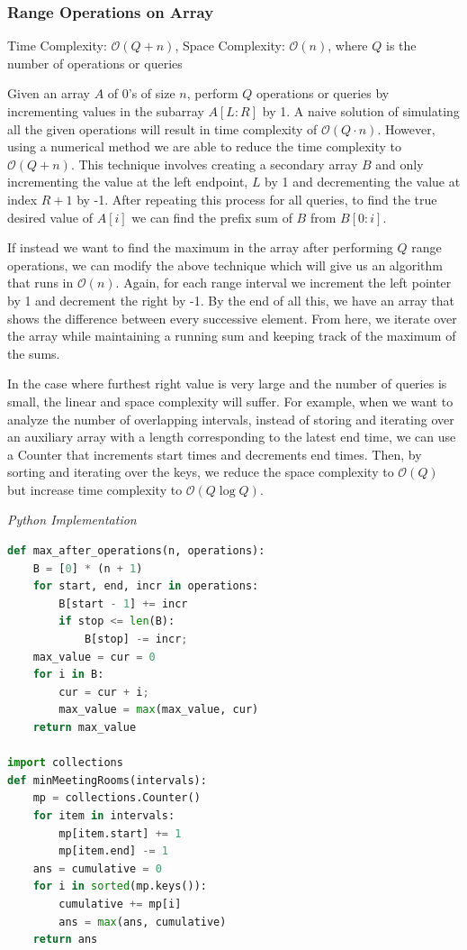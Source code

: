 \documentclass{article}
\newcommand{\bigO}{\mathcal{O}}
\begin{document}
    \subsubsection{Range Operations on Array}
    Time Complexity: $\bigO(Q + n)$, Space Complexity: $\bigO(n)$, where $Q$ is the number of operations or queries
    
    Given an array $A$ of 0's of size $n$, perform $Q$ operations or queries by incrementing values in the subarray $A[L: R]$ by 1. A naive solution of simulating all the given operations will result in time complexity of $\bigO(Q\cdot n)$. However, using a numerical method we are able to reduce the time complexity to $\bigO(Q + n)$. This technique involves creating a secondary array $B$ and only incrementing the value at the left endpoint, $L$ by 1 and decrementing the value at index $R + 1$ by -1. After repeating this process for all queries, to find the true desired value of $A[i]$ we can find the prefix sum of $B$ from $B[0:i]$.
    
    If instead we want to find the maximum in the array after performing $Q$ range operations, we can modify the above technique which will give us an algorithm that runs in $\bigO(n)$. Again, for each range interval we increment the left pointer by 1 and decrement the right by -1. By the end of all this, we have an array that shows the difference between every successive element. From here, we iterate over the array while maintaining a running sum and keeping track of the maximum of the sums.

    In the case where furthest right value is very large and the number of queries is small, the linear and space complexity will suffer. For example, when we want to analyze the number of overlapping intervals, instead of storing and iterating over an auxiliary array with a length corresponding to the latest end time, we can use a Counter that increments start times and decrements end times. Then, by sorting and iterating over the keys, we reduce the space complexity to $\bigO(Q)$ but increase time complexity to $\bigO(Q \log Q)$.
    
\vspace{8pt} \emph{Python Implementation}
\begin{lstlisting}[language=Python]
def max_after_operations(n, operations):
    B = [0] * (n + 1)
    for start, end, incr in operations:
        B[start - 1] += incr
        if stop <= len(B):
            B[stop] -= incr;
    max_value = cur = 0
    for i in B:
        cur = cur + i;
        max_value = max(max_value, cur)
    return max_value

import collections
def minMeetingRooms(intervals):
    mp = collections.Counter()
    for item in intervals:
        mp[item.start] += 1
        mp[item.end] -= 1
    ans = cumulative = 0
    for i in sorted(mp.keys()):
        cumulative += mp[i]
        ans = max(ans, cumulative)
    return ans
\end{lstlisting}
\end{document}
